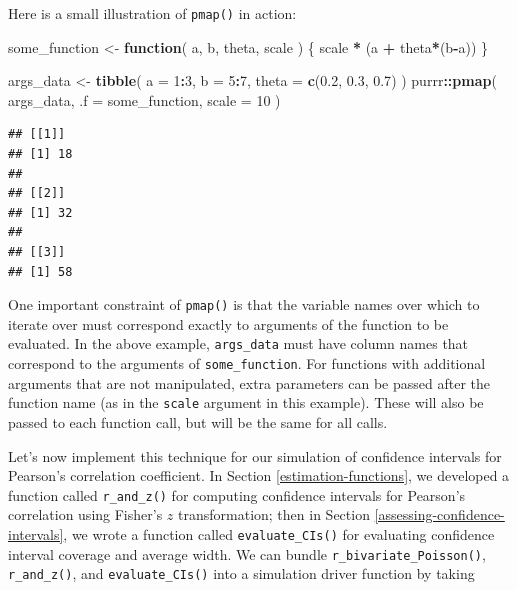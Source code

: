 \documentclass[
]{book}
\newenvironment{Shaded}{\begin{snugshade}}{\end{snugshade}}
\newcommand{\AttributeTok}[1]{\textcolor[rgb]{0.13,0.29,0.53}{#1}}
\newcommand{\ControlFlowTok}[1]{\textcolor[rgb]{0.13,0.29,0.53}{\textbf{#1}}}
\newcommand{\DecValTok}[1]{\textcolor[rgb]{0.00,0.00,0.81}{#1}}
\newcommand{\FloatTok}[1]{\textcolor[rgb]{0.00,0.00,0.81}{#1}}
\newcommand{\FunctionTok}[1]{\textcolor[rgb]{0.13,0.29,0.53}{\textbf{#1}}}
\newcommand{\NormalTok}[1]{#1}
\newcommand{\OtherTok}[1]{\textcolor[rgb]{0.56,0.35,0.01}{#1}}
\newcommand{\SpecialCharTok}[1]{\textcolor[rgb]{0.81,0.36,0.00}{\textbf{#1}}}
\begin{document}
Here is a small illustration of \texttt{pmap()} in action:

\begin{Shaded}
\begin{Highlighting}[]
\NormalTok{some\_function }\OtherTok{\textless{}{-}} \ControlFlowTok{function}\NormalTok{( a, b, theta, scale ) \{}
\NormalTok{    scale }\SpecialCharTok{*}\NormalTok{ (a }\SpecialCharTok{+}\NormalTok{ theta}\SpecialCharTok{*}\NormalTok{(b}\SpecialCharTok{{-}}\NormalTok{a))}
\NormalTok{\}}

\NormalTok{args\_data }\OtherTok{\textless{}{-}} \FunctionTok{tibble}\NormalTok{( }\AttributeTok{a =} \DecValTok{1}\SpecialCharTok{:}\DecValTok{3}\NormalTok{, }\AttributeTok{b =} \DecValTok{5}\SpecialCharTok{:}\DecValTok{7}\NormalTok{, }\AttributeTok{theta =} \FunctionTok{c}\NormalTok{(}\FloatTok{0.2}\NormalTok{, }\FloatTok{0.3}\NormalTok{, }\FloatTok{0.7}\NormalTok{) )}
\NormalTok{purrr}\SpecialCharTok{::}\FunctionTok{pmap}\NormalTok{( args\_data, }\AttributeTok{.f =}\NormalTok{ some\_function, }\AttributeTok{scale =} \DecValTok{10}\NormalTok{ )}
\end{Highlighting}
\end{Shaded}

\begin{verbatim}
## [[1]]
## [1] 18
## 
## [[2]]
## [1] 32
## 
## [[3]]
## [1] 58
\end{verbatim}

One important constraint of \texttt{pmap()} is that the variable names over which to iterate over must correspond exactly to arguments of the function to be evaluated.
In the above example, \texttt{args\_data} must have column names that correspond to the arguments of \texttt{some\_function}.
For functions with additional arguments that are not manipulated, extra parameters can be passed after the function name (as in the \texttt{scale} argument in this example).
These will also be passed to each function call, but will be the same for all calls.

Let's now implement this technique for our simulation of confidence intervals for Pearson's correlation coefficient.
In Section \ref{estimation-functions}, we developed a function called \texttt{r\_and\_z()} for computing confidence intervals for Pearson's correlation using Fisher's \(z\) transformation;
then in Section \ref{assessing-confidence-intervals}, we wrote a function called \texttt{evaluate\_CIs()} for evaluating confidence interval coverage and average width.
We can bundle \texttt{r\_bivariate\_Poisson()}, \texttt{r\_and\_z()}, and \texttt{evaluate\_CIs()} into a simulation driver function by taking
\end{document}
